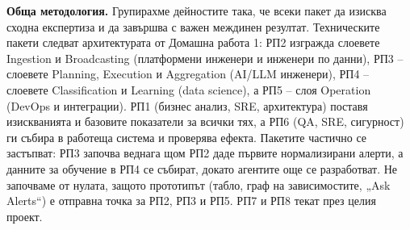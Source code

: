 \documentclass[11pt,a4paper]{article}
\begin{document}
\textbf{Обща методология.} Групирахме дейностите така, че всеки пакет да изисква сходна експертиза и да завършва с важен междинен резултат. Техническите пакети следват архитектурата от Домашна работа 1: РП2 изгражда слоевете Ingestion и Broadcasting (платформени инженери и инженери по данни), РП3 -- слоевете Planning, Execution и Aggregation (AI/LLM инженери), РП4 -- слоевете Classification и Learning (data science), а РП5 -- слоя Operation (DevOps и интеграции). РП1 (бизнес анализ, SRE, архитектура) поставя изискванията и базовите показатели за всички тях, а РП6 (QA, SRE, сигурност) ги събира в работеща система и проверява ефекта. Пакетите частично се застъпват: РП3 започва веднага щом РП2 даде първите нормализирани алерти, а данните за обучение в РП4 се събират, докато агентите още се разработват. Не започваме от нулата, защото прототипът (табло, граф на зависимостите, „Ask Alerts“) е отправна точка за РП2, РП3 и РП5. РП7 и РП8 текат през целия проект.
\end{document}
